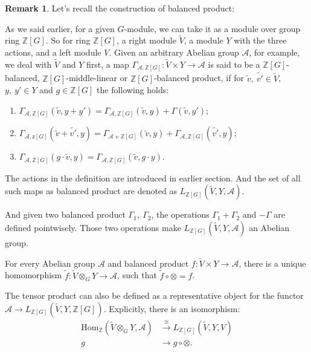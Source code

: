 \documentclass[12pt,a4paper,english]{article}
\theoremstyle{plain}
\theoremstyle{definition}
\newtheorem*{rem}{Remark}
\begin{document}
\begin{rem}
Let's recall the construction of balanced product:

As we said earlier, for a given $G$-module, we can take it as a module over group ring $\mathbb{Z}[G]$. So for ring $\mathbb{Z}[G]$, a  right module $\widetilde{V}$, a module $Y$ with the three actions, and a left module $V$. Given an arbitrary Abelian group $\mathcal{A}$, for example, we deal with $\widetilde{V}$ and $Y$ first, a map $\Gamma_{\mathcal{A},\mathbb{Z}[G]}: \widetilde{V}\times Y\rightarrow \mathcal{A}$ is said to be a $\mathbb{Z}[G]$-balanced, $\mathbb{Z}[G]$-middle-linear or $\mathbb{Z}[G]$-balanced product, if for $\tilde{v},\ \tilde{v'}\in \widetilde{V}$, $y,\ y'\in Y$ and $g\in \mathbb{Z}[G]$ the following holds:
\begin{enumerate}
    \item $\Gamma_{\mathcal{A},\mathbb{Z}[G]}(\widetilde{v}, y+y')=\Gamma_{\mathcal{A},\mathbb{Z}[G]}(\widetilde{v},y)+ \Gamma(\widetilde{v},y')$;
    \item $\Gamma_{\mathcal{A},\mathbb{z}[G]}(\widetilde{v}+\widetilde{v'},y)=\Gamma_{\mathcal{A}+\mathbb{Z}[G]}(\widetilde{v},y)+\Gamma_{\mathcal{A},\mathbb{Z}[G]}(\widetilde{v'},y)$;
    \item $\Gamma_{\mathcal{A},\mathbb{Z}[G]}(g\cdot \widetilde{v},y)=\Gamma_{\mathcal{A},\mathbb{Z}[G]}(\widetilde{v},g\cdot y)$.
\end{enumerate}
The actions in the definition are introduced in earlier section. And
the set of all such maps as balanced product are denoted as $L_{\mathbb{Z}[G]}(\widetilde{V},Y,\mathcal{A})$.

And given two balanced product $\Gamma_{1},\ \Gamma_{2}$, the operations $\Gamma_{1}+\Gamma_{2}$ and $-\Gamma$ are defined pointwisely. Those two operations make $L_{\mathbb{Z}[G]}(\widetilde{V},Y,\mathcal{A})$ an Abelian group.
\end{rem}
For every Abelian group $\mathcal{A}$ and balanced product $f:\widetilde{V}\times Y\rightarrow \mathcal{A}$, there is a unique homomorphism $\widetilde{f}: \widetilde{V}\otimes_{G}Y\rightarrow \mathcal{A}$, such that $\widetilde{f}\circ \otimes=f$. 

The tensor product can also be defined as a representative object for the functor $\mathcal{A}\rightarrow L_{\mathbb{Z}[G]}(\widetilde{V}, Y, \mathbb{Z}[G])$. Explicitly, there is an isomorphism:
\begin{align*}
\text{Hom}_{\mathbb{Z}}(\widetilde{V}\otimes_{G}Y, \mathcal{A})&\xrightarrow{\cong} L_{\mathbb{Z}[G]}(\widetilde{V}, Y, V)\\
g&\rightarrow g\circ \otimes.
\end{align*}
  
\end{document}
